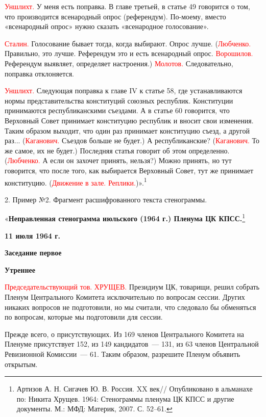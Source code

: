 \documentclass{kursa4}
\begin{document}
      \textcolor{red}{Уншлихт.}{
      У меня есть поправка. В главе третьей, в статье 49 говорится о том, что производится всенародный опрос (референдум). По-моему, вместо «всенародный опрос» нужно сказать «всенародное голосование».}

      \textcolor{red}{Сталин.}{
      Голосование бывает тогда, когда выбирают. Опрос лучше. (}\textcolor{red}{Любченко.}{
      Правильно, это лучше. Референдум это и есть всенародный опрос.} \textcolor{red}{Ворошилов.} Референдум выявляет, определяет настроения.) \textcolor{red}{Молотов.}{
      Следовательно, поправка отклоняется.}

      \textcolor{red}{Уншлихт.}{
      Следующая поправка к главе IV к статье 58, где устанавливаются нормы представительства конституций союзных республик. Конституции принимаются республиканскими съездами. А в статье 60 говорится, что Верховный Совет принимает конституцию республик и вносит свои изменения. Таким образом выходит, что один раз принимает конституцию съезд, а другой раз... (}\textcolor{red}{Каганович.}{
      Съездов больше не будет.) А республиканские? (}\textcolor{red}{Каганович.}{
      То же самое, их не будет.) Последняя статья говорит об этом определенно. (}\textcolor{red}{Любченко.}{
      А если он захочет принять, нельзя?) Можно принять, но тут говорится, что после того, как выбирается Верховный Совет, тут же принимает конституцию. (}\textcolor{red}{Движение в зале. Реплики.}{)».}{\textsuperscript{1}}


      \bigskip

      2. Пример №2. Фрагмент расшифрованного текста стенограммы. \bigskip

      «\textbf{{Неправленная стенограмма июльского (1964 г.) Пленума ЦК КПСС.}}\footnote{ Артизов А. Н. Сигачев Ю. В. Россия. XX век// Опубликовано в альманахе по: Никита Хрущев. 1964: Стенограммы пленума ЦК КПСС и другие документы. М.: МФД: Материк, 2007. С. 52–61.}

      \textbf{{11 июля 1964 г.}}

      \textbf{{Заседание первое}}

      \textbf{{Утреннее}}

      \textcolor{red}{Председательствующий тов. ХРУЩЕВ.}{ Президиум ЦК, товарищи, решил собрать Пленум Центрального Комитета исключительно по вопросам сессии. Других никаких вопросов не }{подготовили, но мы считали, что следовало бы обменяться по вопросам, которые мы подготовили для сессии.}

      {Прежде всего, о присутствующих. Из 169 членов Центрального Комитета на Пленуме присутствует 152, из 149 кандидатов~--- 131, из 63 членов Центральной Ревизионной Комиссии~--- 61. Таким образом, разрешите Пленум объявить открытым.}
\end{document}

